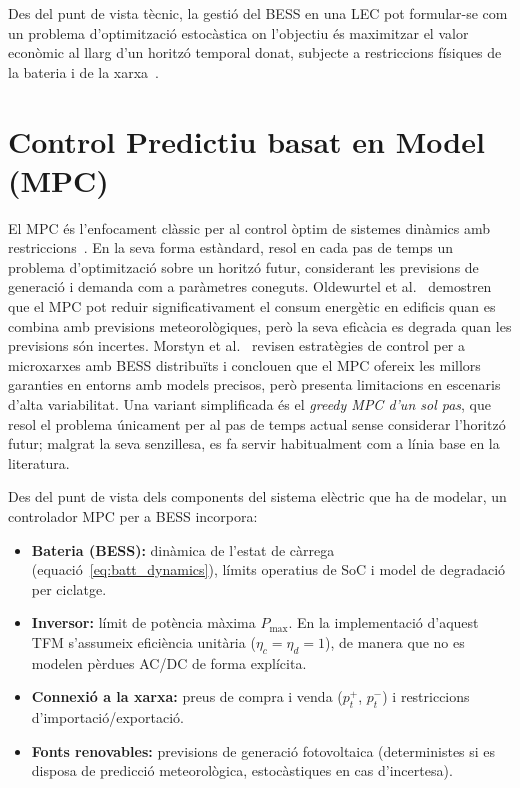 \documentclass[a4paper,12pt,twoside]{ThesisStyle}
\begin{document}
Des del punt de vista tècnic, la gestió del BESS en una LEC pot formular-se com un problema d'optimització estocàstica on l'objectiu és maximitzar el valor econòmic al llarg d'un horitzó temporal donat, subjecte a restriccions físiques de la bateria i de la xarxa~\cite{parra2017review,koirala2016lec}.

\section{Control Predictiu basat en Model (MPC)}

El MPC és l'enfocament clàssic per al control òptim de sistemes dinàmics amb restriccions~\cite{camacho2007mpc,garcia1989mpc}. En la seva forma estàndard, resol en cada pas de temps un problema d'optimització sobre un horitzó futur, considerant les previsions de generació i demanda com a paràmetres coneguts. Oldewurtel et al.~\cite{oldewurtel2012mpc} demostren que el MPC pot reduir significativament el consum energètic en edificis quan es combina amb previsions meteorològiques, però la seva eficàcia es degrada quan les previsions són incertes. Morstyn et al.~\cite{morstyn2018bess} revisen estratègies de control per a microxarxes amb BESS distribuïts i conclouen que el MPC ofereix les millors garanties en entorns amb models precisos, però presenta limitacions en escenaris d'alta variabilitat. Una variant simplificada és el \textit{greedy MPC d'un sol pas}, que resol el problema únicament per al pas de temps actual sense considerar l'horitzó futur; malgrat la seva senzillesa, es fa servir habitualment com a línia base en la literatura.

Des del punt de vista dels components del sistema elèctric que ha de modelar, un controlador MPC per a BESS incorpora:
\begin{itemize}
    \item \textbf{Bateria (BESS):} dinàmica de l'estat de càrrega (equació~\eqref{eq:batt_dynamics}), límits operatius de SoC i model de degradació per ciclatge.
    \item \textbf{Inversor:} límit de potència màxima $P_{\max}$. En la implementació d'aquest TFM s'assumeix eficiència unitària ($\eta_c = \eta_d = 1$), de manera que no es modelen pèrdues AC/DC de forma explícita.
    \item \textbf{Connexió a la xarxa:} preus de compra i venda ($p_t^{+}$, $p_t^{-}$) i restriccions d'importació/exportació.
    \item \textbf{Fonts renovables:} previsions de generació fotovoltaica (deterministes si es disposa de predicció meteorològica, estocàstiques en cas d'incertesa).
\end{itemize}
\end{document}
